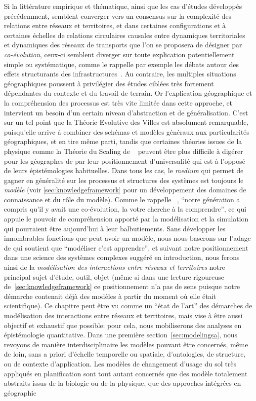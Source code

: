 Si la littérature empirique et thématique, ainsi que les cas d'études développés précédemment, semblent converger vers un consensus sur la complexité des relations entre réseaux et territoires, et dans certaines configurations et à certaines échelles de relations circulaires causales entre dynamiques territoriales et dynamiques des réseaux de transports que l'on se proposera de désigner par \emph{co-évolution}, ceux-ci semblent diverger sur toute explication potentiellement simple ou systématique, comme le rappelle par exemple les débats autour des effets structurants des infrastructures~\cite{offner1993effets}. Au contraire, les multiples situations géographiques poussent à privilégier des études ciblées très fortement dépendantes du contexte et du travail de terrain. Or l'explication géographique et la compréhension des processus est très vite limitée dans cette approche, et intervient un besoin d'un certain niveau d'abstraction et de généralisation. C'est sur un tel point que la Théorie Evolutive des Villes est absolument remarquable, puisqu'elle arrive à combiner des schémas et modèles généraux aux particularités géographiques, et en tire même parti, tandis que certaines théories issues de la physique comme la Théorie du Scaling de ~\cite{west2017scaling} peuvent être plus difficile à digérer pour les géographes de par leur positionnement d'universalité qui est à l'opposé de leurs épistémologies habituelles. Dans tous les cas, le \emph{medium} qui permet de gagner en généralité sur les processus et structures des systèmes est toujours le \emph{modèle} (voir \ref{sec:knowledgeframework} pour un développement des domaines de connaissance et du rôle du modèle). Comme le rappelle ~\cite{raimbault2017entretiens}, ``notre génération a compris qu'il y avait une co-évolution, la votre cherche à la comprendre'', ce qui appuie le pouvoir de compréhension apporté par la modélisation et la simulation qui pourraient être aujourd'hui à leur balbutiements. Sans développer les innombrables fonctions que peut avoir un modèle, nous nous baserons sur l'adage de  qui soutient que ``modéliser c'est apprendre'', et suivant notre positionnement dans une science des systèmes complexes suggéré en introduction, nous ferons ainsi de la \emph{modélisation des interactions entre réseaux et territoires} notre principal sujet d'étude, outil, objet (même si dans une lecture rigoureuse de~\ref{sec:knowledgeframework} ce positionnement n'a pas de sens puisque notre démarche contenait déjà des modèles à partir du moment où elle était scientifique). Ce chapitre peut être vu comme un ``état de l'art'' des démarches de modélisation des interactions entre réseaux et territoires, mais vise à être aussi objectif et exhaustif que possible: pour cela, nous mobiliserons des analyses en épistémologie quantitative. Dans une première section~\ref{sec:modelingsa}, nous revoyons de manière interdisciplinaire les modèles pouvant être concernés, même de loin, sans a priori d'échelle temporelle ou spatiale, d'ontologies, de structure, ou de contexte d'application. Les modèles de changement d'usage du sol très appliqués en planification sont tout autant concernés que des modèle totalement abstraits issus de la biologie ou de la physique, que des approches intégrées en géographie 